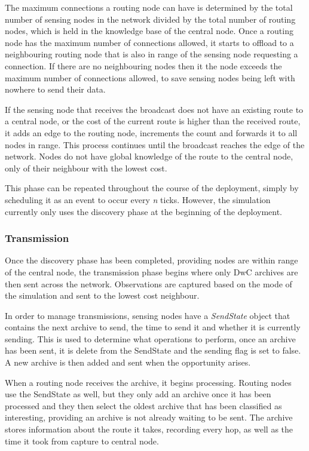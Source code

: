 	The maximum connections a routing node can have is determined by the total number of sensing nodes in the network divided by the total number of routing nodes, which is held in the knowledge base of the central node. Once a routing node has the maximum number of connections allowed, it starts to offload to a neighbouring routing node that is also in range of the sensing node requesting a connection. If there are no neighbouring nodes then it the node exceeds the maximum number of connections allowed, to save sensing nodes being left with nowhere to send their data.
	
	If the sensing node that receives the broadcast does not have an existing route to a central node, or the cost of the current route is higher than the received route, it adds an edge to the routing node, increments the count and forwards it to all nodes in range. This process continues until the broadcast reaches the edge of the network. Nodes do not have global knowledge of the route to the central node, only of their neighbour with the lowest cost.
	
	This phase can be repeated throughout the course of the deployment, simply by scheduling it as an event to occur every \textit{n} ticks. However, the simulation currently only uses the discovery phase at the beginning of the deployment.
	
\subsubsection{Transmission}
	Once the discovery phase has been completed, providing nodes are within range of the central node, the transmission phase begins where only DwC archives are then sent across the network. Observations are captured based on the mode of the simulation and sent to the lowest cost neighbour.
	
	In order to manage transmissions, sensing nodes have a \textit{SendState} object that contains the next archive to send, the time to send it and whether it is currently sending. This is used to determine what operations to perform, once an archive has been sent, it is delete from the SendState and the sending flag is set to false. A new archive is then added and sent when the opportunity arises.
	
	When a routing node receives the archive, it begins processing. Routing nodes use the SendState as well, but they only add an archive once it has been processed and they then select the oldest archive that has been classified as interesting, providing an archive is not already waiting to be sent. The archive stores information about the route it takes, recording every hop, as well as the time it took from capture to central node.
	
